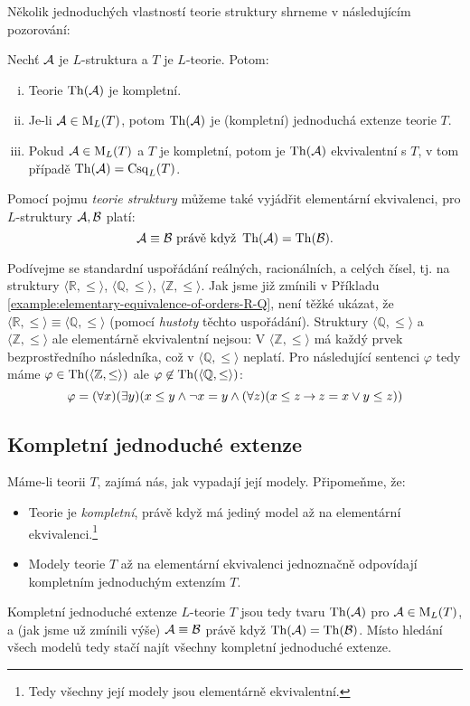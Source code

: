 Několik jednoduchých vlastností teorie struktury shrneme v následujícím pozorování:

\begin{observation}
    Nechť $\mathcal{A}$ je $L$-struktura a $T$ je $L$-teorie. Potom:
    \begin{enumerate}[(i)]
        \item Teorie $\operatorname{Th}(\mathcal{A})$ je kompletní.
        \item Je-li $\mathcal{A}\in\operatorname{M}_L(T)$, potom $\operatorname{Th}(\mathcal{A})$ je (kompletní) jednoduchá extenze teorie $T$.
        \item Pokud $\mathcal{A}\in\operatorname{M}_L(T)$ a $T$ je kompletní, potom je $\operatorname{Th}(\mathcal{A})$ ekvivalentní s $T$, v tom případě $\operatorname{Th}(\mathcal{A})=\operatorname{Csq}_L(T)$.
    \end{enumerate}    
\end{observation}

Pomocí pojmu \emph{teorie struktury} můžeme také vyjádřit elementární ekvivalenci, pro $L$-struktury $\mathcal{A},\mathcal{B}$ platí:
$$
\mathcal{A}\equiv\mathcal{B} \text{ právě když }\operatorname{Th}(\mathcal{A})=\operatorname{Th}(\mathcal{B}).
$$

\begin{example}
   Podívejme se standardní uspořádání reálných, racionálních, a celých čísel, tj. na struktury $\langle\mathbb R,\leq\rangle$, $\langle\mathbb Q,\leq\rangle$, $\langle\mathbb Z,\leq\rangle$. Jak jsme již zmínili v Příkladu \ref{example:elementary-equivalence-of-orders-R-Q}, není těžké ukázat, že $\langle\mathbb R,\leq\rangle\equiv\langle\mathbb Q,\leq\rangle$ (pomocí \emph{hustoty} těchto uspořádání). Struktury $\langle\mathbb Q,\leq\rangle$ a $\langle\mathbb Z,\leq\rangle$ ale elementárně ekvivalentní nejsou: V $\langle\mathbb Z,\leq\rangle$ má každý prvek bezprostředního následníka, což v $\langle\mathbb Q,\leq\rangle$ neplatí. Pro následující sentenci $\varphi$ tedy máme $\varphi\in\operatorname{Th}(\langle\mathbb Z,\leq\rangle)$ ale $\varphi\not\in\operatorname{Th}(\langle\mathbb Q,\leq\rangle)$:
   $$
   \varphi=(\forall x)(\exists y)(x\leq y\land \neg x=y\land(\forall z)(x\leq z\mathbin{\rightarrow} z=x\lor y\leq z))
   $$
\end{example}


\subsection{Kompletní jednoduché extenze}

Máme-li teorii $T$, zajímá nás, jak vypadají její modely. Připomeňme, že:
\begin{itemize}
    \item Teorie je \emph{kompletní}, právě když má jediný model až na elementární ekvivalenci.\footnote{Tedy všechny její modely jsou elementárně ekvivalentní.}
    \item Modely teorie $T$ až na elementární ekvivalenci jednoznačně odpovídají kompletním jednoduchým extenzím $T$.
\end{itemize}
Kompletní jednoduché extenze $L$-teorie $T$ jsou tedy tvaru $\operatorname{Th}(\mathcal{A})$ pro $\mathcal{A}\in\operatorname{M}_L(T)$, a (jak jsme už zmínili výše) $\mathcal{A}\equiv\mathcal{B}$ právě když $\operatorname{Th}(\mathcal{A})=\operatorname{Th}(\mathcal{B})$. Místo hledání všech modelů tedy stačí najít všechny kompletní jednoduché extenze.

